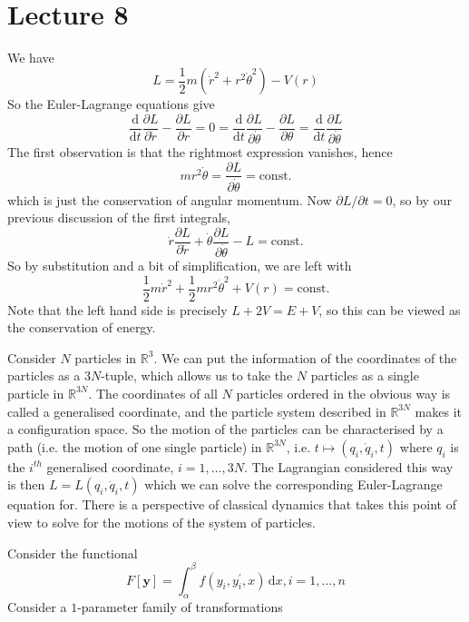 \documentclass[a4paper]{article}
\begin{document}
\part*{Lecture 8}
\begin{example}
    We have
    $$L=\frac{1}{2}m(\dot{r}^2+r^2\dot{\theta}^2)-V(r)$$
    So the Euler-Lagrange equations give
    $$\frac{\mathrm d}{\mathrm dt}\frac{\partial L}{\partial \dot{r}}-\frac{\partial L}{\partial r}=0=\frac{\mathrm d}{\mathrm dt}\frac{\partial L}{\partial \dot{\theta}}-\frac{\partial L}{\partial \theta}=\frac{\mathrm d}{\mathrm dt}\frac{\partial L}{\partial \dot{\theta}}$$
    The first observation is that the rightmost expression vanishes, hence
    $$mr^2\dot{\theta}=\frac{\partial L}{\partial\dot{\theta}}=\text{const.}$$
    which is just the conservation of angular momentum.
    Now $\partial L/\partial t=0$, so by our previous discussion of the first integrals,
    $$\dot{r}\frac{\partial L}{\partial \dot{r}}+\dot{\theta}\frac{\partial L}{\partial\dot{\theta}}-L=\text{const.}$$
    So by substitution and a bit of simplification, we are left with
    $$\frac{1}{2}m\dot{r}^2+\frac{1}{2}mr^2\dot{\theta}^2+V(r)=\text{const.}$$
    Note that the left hand side is precisely $L+2V=E+V$, so this can be viewed as the conservation of energy.
\end{example}
\begin{example}
    Consider $N$ particles in $\mathbb R^3$.
    We can put the information of the coordinates of the particles as a $3N$-tuple, which allows us to take the $N$ particles as a single particle in $\mathbb R^{3N}$.
    The coordinates of all $N$ particles ordered in the obvious way is called a generalised coordinate, and the particle system described in $\mathbb R^{3N}$ makes it a configuration space.
    So the motion of the particles can be characterised by a path (i.e. the motion of one single particle) in $\mathbb R^{3N}$, i.e. $t\mapsto (q_i,\dot{q}_i,t)$ where $q_i$ is the $i^{th}$ generalised coordinate, $i=1,\ldots,3N$.
    The Lagrangian considered this way is then $L=L(q_i,\dot{q}_i,t)$ which we can solve the corresponding Euler-Lagrange equation for.
    There is a perspective of classical dynamics that takes this point of view to solve for the motions of the system of particles.
\end{example}
Consider the functional
$$F[\mathbf{y}]=\int_\alpha^\beta f(y_i,y_i^\prime,x)\,\mathrm dx,i=1,\ldots,n$$
Consider a $1$-parameter family of transformations
\end{document}
